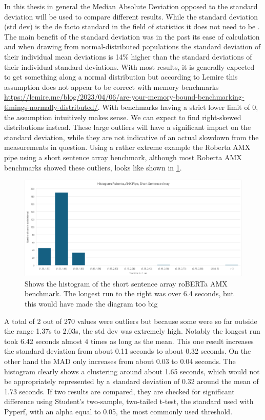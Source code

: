In this thesis in general the Median Absolute Deviation opposed to the standard deviation will be used to compare different results. While the standard deviation (std dev) is the de facto standard in the field of statistics it does not need to be \cite{gorard_revisiting_2005}. The main benefit of the standard deviation was in the past its ease of calculation and when drawing from normal-distributed populations \guillemotright the standard deviation of their individual mean deviations is 14\% higher than the standard deviations of their individual standard deviations.\guillemotleft \cite{gorard_revisiting_2005}
With most results, it is generally expected to get something along a normal distribution but according to Lemire this assumption does not appear to be correct with memory benchmarks \url{https://lemire.me/blog/2023/04/06/are-your-memory-bound-benchmarking-timings-normally-distributed/}. With benchmarks having a strict lower limit of 0, the assumption intuitively makes sense. We can expect to find right-skewed distributions instead. These large outliers will have a significant impact on the standard deviation, while they are not indicative of an actual slowdown from the measurements in question. Using a rather extreme example the Roberta AMX pipe using a short sentence array benchmark, although most Roberta AMX benchmarks showed these outliers, looks like shown in \cref{fig:histogramm}.
\begin{figure}
\centering
\includegraphics[width=\textwidth]{figures/Histogramm.png}
\caption{Shows the histogram of the short sentence array roBERTa AMX benchmark. The longest run to the right was over 6.4 seconds, but this would have made the diagram too big}
\label{fig:histogramm}
\end{figure}
A total of 2 out of 270 values were outliers but because some were so far outside the range 1.37s to 2.03s, the std dev was extremely high. Notably the longest run took 6.42 seconds almost 4 times as long as the mean. This one result increases the standard deviation from about 0.11 seconds to about 0.32 seconds. On the other hand the MAD only increases from about 0.03 to 0.04 seconds. The histogram clearly shows a clustering around about  1.65 seconds, which would not be appropriately represented by a standard deviation of 0.32 around the mean of 1.73 seconds. If two results are compared, they are checked for significant difference using Student’s two-sample, two-tailed t-test, the standard used with Pyperf, with an alpha equal to 0.05, the most commonly used threshold. 

